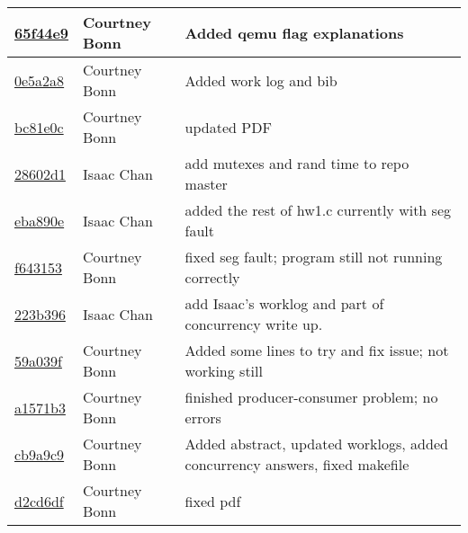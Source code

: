 \begin{tabular}{l l l}
\href{https://github.com/courtbonn/CS-444/commit/65f44e9b825be2bfaf5fb62037531ac516fe91d3}{65f44e9} & Courtney Bonn & Added qemu flag explanations\\\hline
\href{https://github.com/courtbonn/CS-444/commit/0e5a2a8615574269544771707abf67ed5f775a46}{0e5a2a8} & Courtney Bonn & Added work log and bib\\\hline
\href{https://github.com/courtbonn/CS-444/commit/bc81e0c881560deeef263a0732dae8476999999d}{bc81e0c} & Courtney Bonn & updated PDF\\\hline
\href{https://github.com/courtbonn/CS-444/commit/28602d145c5249d1feb8a2813a429ddc43211c2c}{28602d1} & Isaac Chan & add mutexes and rand time to repo master\\\hline
\href{https://github.com/courtbonn/CS-444/commit/eba890e8ea9640c4723e587f8aedafa088e14bd9}{eba890e} & Isaac Chan & added the rest of hw1.c currently with seg fault\\\hline
\href{https://github.com/courtbonn/CS-444/commit/f64315399021183e4c4e9ddaa2b4f55bf24ca3f0}{f643153} & Courtney Bonn & fixed seg fault; program still not running correctly\\\hline
\href{https://github.com/courtbonn/CS-444/commit/223b3969975954043e29b636d3047910f5b09a26}{223b396} & Isaac Chan & add Isaac's worklog and part of concurrency write up.\\\hline
\href{https://github.com/courtbonn/CS-444/commit/59a039f3dc01a5f965dda35aebac82b56188ecc7}{59a039f} & Courtney Bonn & Added some lines to try and fix issue; not working still\\\hline
\href{https://github.com/courtbonn/CS-444/commit/a1571b350bf3104b5add44e6ce48917ca888dea6}{a1571b3} & Courtney Bonn & finished producer-consumer problem; no errors\\\hline
\href{https://github.com/courtbonn/CS-444/commit/cb9a9c988fdb22f5364a44ecfc95c18a3f72ae3d}{cb9a9c9} & Courtney Bonn & Added abstract, updated worklogs, added concurrency answers, fixed makefile\\\hline
\href{https://github.com/courtbonn/CS-444/commit/d2cd6dfd0888c09678fff0cb0b561ad5f65cfb9b}{d2cd6df} & Courtney Bonn & fixed pdf\\\hline\end{tabular}
